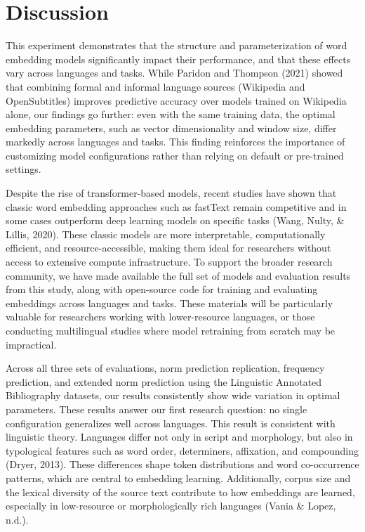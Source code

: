 \documentclass[
  english,
  man,floatsintext]{apa6}
\begin{document}
\section{Discussion}\label{discussion}

This experiment demonstrates that the structure and parameterization of word embedding models significantly impact their performance, and that these effects vary across languages and tasks. While Paridon and Thompson (2021) showed that combining formal and informal language sources (Wikipedia and OpenSubtitles) improves predictive accuracy over models trained on Wikipedia alone, our findings go further: even with the same training data, the optimal embedding parameters, such as vector dimensionality and window size, differ markedly across languages and tasks. This finding reinforces the importance of customizing model configurations rather than relying on default or pre-trained settings.

Despite the rise of transformer-based models, recent studies have shown that classic word embedding approaches such as fastText remain competitive and in some cases outperform deep learning models on specific tasks (Wang, Nulty, \& Lillis, 2020). These classic models are more interpretable, computationally efficient, and resource-accessible, making them ideal for researchers without access to extensive compute infrastructure. To support the broader research community, we have made available the full set of models and evaluation results from this study, along with open-source code for training and evaluating embeddings across languages and tasks. These materials will be particularly valuable for researchers working with lower-resource languages, or those conducting multilingual studies where model retraining from scratch may be impractical.

Across all three sets of evaluations, norm prediction replication, frequency prediction, and extended norm prediction using the Linguistic Annotated Bibliography datasets, our results consistently show wide variation in optimal parameters. These results answer our first research question: no single configuration generalizes well across languages. This result is consistent with linguistic theory. Languages differ not only in script and morphology, but also in typological features such as word order, determiners, affixation, and compounding (Dryer, 2013). These differences shape token distributions and word co-occurrence patterns, which are central to embedding learning. Additionally, corpus size and the lexical diversity of the source text contribute to how embeddings are learned, especially in low-resource or morphologically rich languages (Vania \& Lopez, n.d.).
\end{document}
